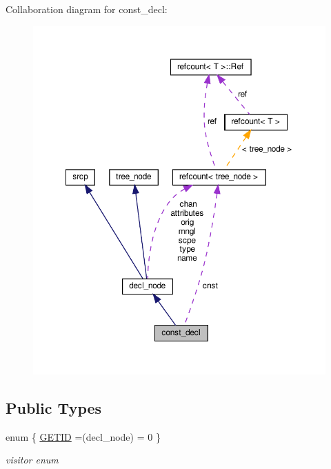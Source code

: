 Collaboration diagram for const\+\_\+decl\+:
\nopagebreak
\begin{figure}[H]
\begin{center}
\leavevmode
\includegraphics[width=350pt]{d6/d0b/structconst__decl__coll__graph}
\end{center}
\end{figure}
\subsection*{Public Types}
\begin{DoxyCompactItemize}
\item 
enum \{ \hyperlink{structconst__decl_af7ab363d7263475e0f4a9fcfd7823638a557a81b18912e4e16d54fd2127853ba1}{G\+E\+T\+ID} =(decl\+\_\+node) = 0
 \}\begin{DoxyCompactList}\small\item\em visitor enum \end{DoxyCompactList}
\end{DoxyCompactItemize}
